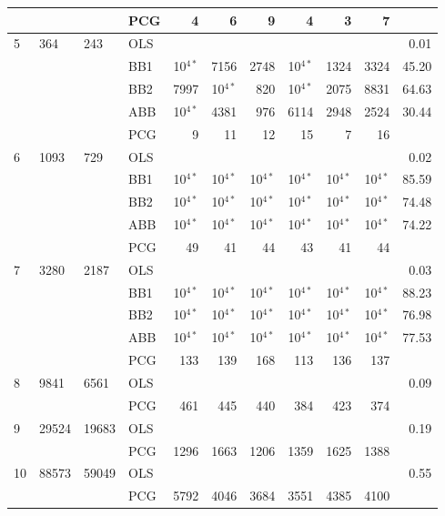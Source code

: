 \documentclass[11pt]{article}
\newcommand{\0}{\phantom{0}}
\begin{document}
\begin{table}[ht]
\begin{threeparttable}
\begin{tabular}{llllrrrrrrr}
			& & & PCG & 4 & 6 & 9 & 4 & 3 & 7 & \pmb{$0.30$} \\
			\midrule
			5 & 364 & 243 & OLS & & & & & & & 0.01 \\
			& & & BB1 & 10$^{4*}$ & 7156 & 2748 & 10$^{4*}$ & 1324 & 3324 & 45.20 \\
			& & & BB2 & 7997 & 10$^{4*}$ & 820 & 10$^{4*}$ & 2075 & 8831 & 64.63 \\
			& & & ABB & 10$^{4*}$ & 4381 & 976 & 6114 & 2948 & 2524 & 30.44 \\
			& & & PCG & 9 & 11 & 12 & 15 & 7 & 16 & \pmb{$0.53$} \\
			\midrule		
			6 & 1093 & 729 & OLS & & & & & & & 0.02 \\
			& & & BB1 & 10$^{4*}$ & 10$^{4*}$ & 10$^{4*}$ & 10$^{4*}$ & 10$^{4*}$ & 10$^{4*}$ & 85.59 \\
			& & & BB2 & 10$^{4*}$ & 10$^{4*}$ & 10$^{4*}$ & 10$^{4*}$ & 10$^{4*}$ & 10$^{4*}$ & 74.48 \\
			& & & ABB & 10$^{4*}$ & 10$^{4*}$ & 10$^{4*}$ & 10$^{4*}$ & 10$^{4*}$ & 10$^{4*}$ & 74.22 \\
			& & & PCG & 49 & 41 & 44 & 43 & 41 & 44 & \pmb{$1.32$} \\
			\midrule
			7 & 3280 & 2187 & OLS & & & & & & & 0.03 \\
			& & & BB1 & 10$^{4*}$ & 10$^{4*}$ & 10$^{4*}$ & 10$^{4*}$ & 10$^{4*}$ & 10$^{4*}$ & 88.23 \\
			& & & BB2 & 10$^{4*}$ & 10$^{4*}$ & 10$^{4*}$ & 10$^{4*}$ & 10$^{4*}$ & 10$^{4*}$ & 76.98 \\
			& & & ABB & 10$^{4*}$ & 10$^{4*}$ & 10$^{4*}$ & 10$^{4*}$ & 10$^{4*}$ & 10$^{4*}$ & 77.53 \\
			& & & PCG & 133 & 139 & 168 & 113 & 136 & 137 & \pmb{$4.48$} \\
			\midrule
			8 & 9841 & 6561 & OLS & & & & & & & 0.09 \\
			& & & PCG & 461 & 445 & 440 & 384 & 423 & 374 & \pmb{$26.25$} \\
			\midrule
			9 & 29524 & 19683 & OLS & & & & & & & 0.19 \\
			& & & PCG & 1296 & 1663 & 1206 & 1359 & 1625 & 1388 & \pmb{$227.40$} \\
			\midrule		
			10 & 88573 & 59049 & OLS & & & & & & & 0.55 \\
			& & & PCG & 5792 & 4046 & 3684 & 3551 & 4385 & 4100 & \pmb{$3274.80$}\\

\end{tabular}
\end{threeparttable}
\end{table}
\end{document}
